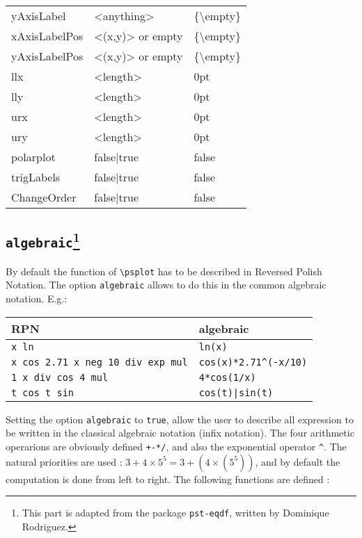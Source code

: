 {\begin{longtable}{lll}
yAxisLabel        & <anything> & \{\textbackslash\@ empty\}\\
xAxisLabelPos     & <(x,y)> or empty & \{\textbackslash\@ empty\}\\
yAxisLabelPos     & <(x,y)> or empty & \{\textbackslash\@ empty\}\\
llx               & <length>  & 0pt\\
lly               & <length>  & 0pt\\
urx               & <length>  & 0pt\\
ury               & <length>  & 0pt\\
polarplot         & false|true    & false\\
trigLabels        & false|true    & false\\
ChangeOrder        & false|true    & false\\
\end{longtable}
}


\clearpage
\subsection[\texttt{algebraic}]{\texttt{algebraic}\footnote{This part is adapted from the package \texttt{pst-eqdf}, written by Dominique Rodriguez.}}
By default the function of \verb+\psplot+ has to be described in Reversed Polish Notation.
The option \verb+algebraic+ allows to do this in the common algebraic notation. E.g.:

\begin{tabular}{l|l}
RPN & algebraic\\\hline
\verb+x ln+ & \verb+ln(x)+\\
\verb+x cos 2.71 x neg 10 div exp mul+ & \verb+cos(x)*2.71^(-x/10)+\\
\verb+1 x div cos 4 mul+ & \verb+4*cos(1/x)+\\
\verb+t cos t sin+ & \verb+cos(t)|sin(t)+
\end{tabular}

Setting the option \verb$algebraic$ to \verb$true$, allow the user to describe all
expression to be written in the classical algebraic notation (infix notation). The four arithmetic
operarions are obviously defined \verb$+-*/$, and also the exponential operator
\verb$^$. The natural priorities are used : $3+4\times 5^5=3+(4\times (5^5))$, and by default
the computation is done from left to right. The following functions are defined :

